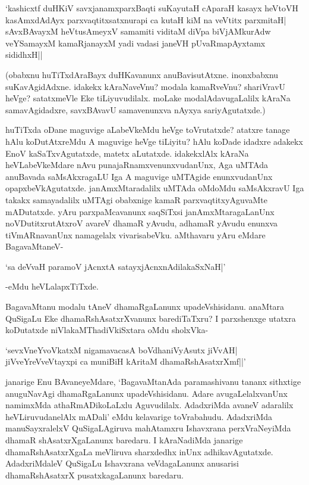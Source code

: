 \begin{shloka}
`kashicxtf duHKiV savxjanamxparxBaqti suKayutaH cAparaH kasayx heVtoVH\\
kasAmxdAdAyx parxvaqtitxsatxnurapi ca kutaH kiM na veVtitx parxmitaH|\\
sAvxBAvayxM heVtusAmeyxV samamiti viditaM diVpa biVjAMkurAdw\\
veYSamayxM kamaRjanayxM yadi vadasi janeVH pUvaRmapAyxtamx sididhxH||
\end{shloka}

(obabxnu huTiTxdAraBayx duHKavanunx anuBavisutAtxne. inonxbabxnu suKavAgidAdxne. idakekx kAraNaveVnu? modala kamaRveVnu? shariVravU heVge? satatxmeVle Eke tiLiyuvudilalx. moLake modalAdavugaLalilx kAraNa samavAgidadxre, savxBAvavU samavenunxva nAyxya sariyAgutatxde.)

huTiTxda oDane maguvige aLabeVkeMdu heVge toVrutatxde? atatxre tanage hAlu koDutAtxreMdu A maguvige heVge tiLiyitu? hAlu koDade idadxre adakekx EnoV kaSaTxvAgutatxde, matetx aLutatxde. idakekxlAlx kAraNa heVLabeVkeMdare nAvu punajaRnamxvenunxvudanUnx, Aga uMTAda anuBavada saMsAkxragaLU Iga A maguvige uMTAgide enunxvudanUnx opapxbeVkAgutatxde. janAmxMtaradalilx uMTAda oMdoMdu saMsAkxravU Iga takakx samayadalilx uMTAgi obabxnige kamaR parxvaqtitxyAguvaMte mADutatxde. yAru parxpaMcavanunx saqSiTxsi janAmxMtaragaLanUnx noVDutitxrutAtxroV avareV dhamaR yAvudu, adhamaR yAvudu enunxva tiVmARnavanUnx namagelalx vivarisabeVku. aMthavaru yAru eMdare BagavaMtaneV-

\begin{shloka}
`sa deVvaH paramoV jAcnxtA satayxjAcnxnAdilakaSxNaH|'
\end{shloka}

-eMdu heVLalapxTiTxde.

BagavaMtanu modalu tAneV dhamaRgaLanunx upadeVshisidanu. anaMtara QuSigaLu Eke dhamaRshAsatxrXvanunx barediTaTxru? I parxshenxge utatxra koDutatxde niVlakaMThadiVkiSxtara oMdu sholxVka-

\begin{shloka}
`sevxVneYvoVkatxM nigamavacasA boVdhaniVyAsutx jiVvAH|\\
jiVveYreVveVtayxpi ca muniBiH kAritaM dhamaRshAsatxrXmf||'
\end{shloka}

janarige Enu BAvaneyeMdare, `BagavaMtanAda paramashivanu tananx sithxtige anuguNavAgi dhamaRgaLanunx upadeVshisidanu. Adare avugaLelalxvanUnx namimxMda athaRmADikoLaLxlu Aguvudilalx. AdadxriMda avaneV adaralilx heVLiruvudanelAlx mADali' eMdu kelavarige toVrabahudu. AdadxriMda manuSayxralelxV QuSigaLAgiruva mahAtamxru Ishavxrana perxVraNeyiMda dhamaR shAsatxrXgaLanunx baredaru. I kAraNadiMda janarige dhamaRshAsatxrXgaLa meVliruva sharxdedhx inUnx adhikavAgutatxde. AdadxriMdaleV QuSigaLu Ishavxrana veVdagaLanunx anusarisi dhamaRshAsatxrX pusatxkagaLanunx baredaru.

